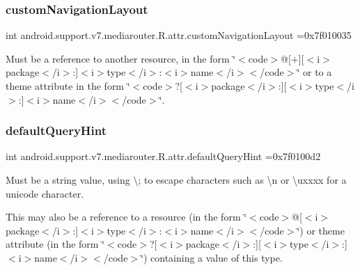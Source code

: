 \subsubsection{\texorpdfstring{custom\+Navigation\+Layout}{customNavigationLayout}}
{\footnotesize\ttfamily int android.\+support.\+v7.\+mediarouter.\+R.\+attr.\+custom\+Navigation\+Layout =0x7f010035\hspace{0.3cm}{\ttfamily [static]}}

Must be a reference to another resource, in the form \char`\"{}$<$code$>$@\mbox{[}+\mbox{]}\mbox{[}$<$i$>$package$<$/i$>$\+:\mbox{]}$<$i$>$type$<$/i$>$\+:$<$i$>$name$<$/i$>$$<$/code$>$\char`\"{} or to a theme attribute in the form \char`\"{}$<$code$>$?\mbox{[}$<$i$>$package$<$/i$>$\+:\mbox{]}\mbox{[}$<$i$>$type$<$/i$>$\+:\mbox{]}$<$i$>$name$<$/i$>$$<$/code$>$\char`\"{}. \mbox{\label{classandroid_1_1support_1_1v7_1_1mediarouter_1_1R_1_1attr_ad68760a1fd767d292c3eb3ea720e2ecc}} 
\subsubsection{\texorpdfstring{default\+Query\+Hint}{defaultQueryHint}}
{\footnotesize\ttfamily int android.\+support.\+v7.\+mediarouter.\+R.\+attr.\+default\+Query\+Hint =0x7f0100d2\hspace{0.3cm}{\ttfamily [static]}}

Must be a string value, using \textquotesingle{}\textbackslash{};\textquotesingle{} to escape characters such as \textquotesingle{}\textbackslash{}n\textquotesingle{} or \textquotesingle{}\textbackslash{}uxxxx\textquotesingle{} for a unicode character. 

This may also be a reference to a resource (in the form \char`\"{}$<$code$>$@\mbox{[}$<$i$>$package$<$/i$>$\+:\mbox{]}$<$i$>$type$<$/i$>$\+:$<$i$>$name$<$/i$>$$<$/code$>$\char`\"{}) or theme attribute (in the form \char`\"{}$<$code$>$?\mbox{[}$<$i$>$package$<$/i$>$\+:\mbox{]}\mbox{[}$<$i$>$type$<$/i$>$\+:\mbox{]}$<$i$>$name$<$/i$>$$<$/code$>$\char`\"{}) containing a value of this type. \mbox{\label{classandroid_1_1support_1_1v7_1_1mediarouter_1_1R_1_1attr_adafd11447e4528712df28c762b51f02d}} 
